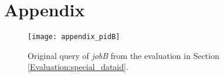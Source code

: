 \documentclass[draft,final]{vutinfth} %
\begin{document}

\chapter{Appendix}\label{Appendix}

\begin{figure}[h]
	\centering
	\texttt{[image: appendix\_pidB]}
	\caption{Original query of \textit{jobB} from the evaluation in Section \ref{Evaluation:special_dataid}.}
	\label{fig:appendix_pidB} %
\end{figure}
\end{document}
